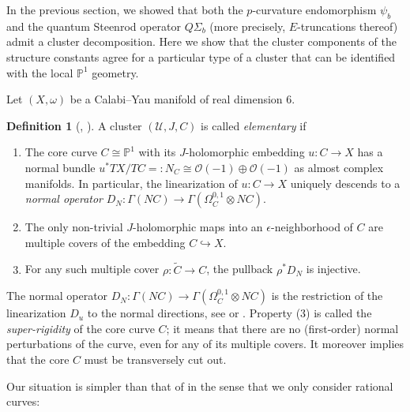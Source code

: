 \documentclass[reqno]{amsart}
\numberwithin{equation}{section}
\numberwithin{equation}{section}
\numberwithin{equation}{section}
\theoremstyle{definition}
\newtheorem{defn}[thm]{Definition}
\theoremstyle{remark}
\theoremstyle{remark}
\begin{document}
In the previous section, we showed that both the $p$-curvature endomorphism $\psi_b$ and the quantum Steenrod operator $Q\Sigma_b$ (more precisely, $E$-truncations thereof) admit a cluster decomposition. Here we show that the cluster components of the structure constants agree for a particular type of a cluster that can be identified with the local $\mathbb{P}^1$ geometry. 

Let $(X,\omega)$ be a Calabi--Yau manifold of real dimension $6$.

\begin{defn}[{\cite[Definition 3.1]{IP-GV}, \cite[Definition 3.42]{doan2021gopakumar}}]
    A cluster $(\mathcal{U}, J, C)$ is called \emph{elementary} if
    \begin{enumerate}
        \item The core curve $C \cong \mathbb{P}^1$ with its $J$-holomorphic embedding $u: C \to X$ has a normal bundle $u^*TX/TC =:N_C \cong \mathcal{O}(-1) \oplus \mathcal{O}(-1)$ as almost complex manifolds. In particular, the linearization of $u : C \to X$ uniquely descends to a \emph{normal operator} $D_N:\Gamma(NC) \to \Gamma(\Omega^{0,1}_C \otimes NC)$.
        \item The only non-trivial $J$-holomorphic maps into an $\epsilon$-neighborhood of $C$ are multiple covers of the embedding $C \hookrightarrow X$.
        \item For any such multiple cover $\rho: \widetilde{C} \to C$, the pullback $\rho^* D_N$ is injective.
    \end{enumerate}
\end{defn}
The normal operator $D_N : \Gamma(NC) \to \Gamma(\Omega^{0,1}_C \otimes NC)$ is the restriction of the linearization $D_u$ to the normal directions, see \cite[(4.15)]{IP-GV} or \cite[Section 3.2]{Lee23a}. Property (3) is called the \emph{super-rigidity} of the core curve $C$; it means that there are no (first-order) normal perturbations of the curve, even for any of its multiple covers. It moreover implies that the core $C$ must be transversely cut out.

Our situation is simpler than that of \cite{IP-GV, doan2021gopakumar} in the sense that we only consider rational curves:
\end{document}
